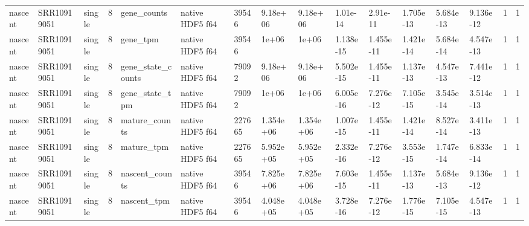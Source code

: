 \begin{tabular}{llllllllllllllll}
nascent & SRR10919051 & single & 8 & gene\_counts & native HDF5 f64 & 39546 & 9.18e+06 & 9.18e+06 & 1.01e-14 & 2.91e-11 & 1.705e-13 & 5.684e-13 & 9.136e-12 & 1 & 1 \\
nascent & SRR10919051 & single & 8 & gene\_tpm & native HDF5 f64 & 39546 & 1e+06 & 1e+06 & 1.138e-15 & 1.455e-11 & 1.421e-14 & 5.684e-14 & 4.547e-13 & 1 & 1 \\
nascent & SRR10919051 & single & 8 & gene\_state\_counts & native HDF5 f64 & 79092 & 9.18e+06 & 9.18e+06 & 5.502e-15 & 1.455e-11 & 1.137e-13 & 4.547e-13 & 7.441e-12 & 1 & 1 \\
nascent & SRR10919051 & single & 8 & gene\_state\_tpm & native HDF5 f64 & 79092 & 1e+06 & 1e+06 & 6.005e-16 & 7.276e-12 & 7.105e-15 & 3.545e-14 & 3.514e-13 & 1 & 1 \\
nascent & SRR10919051 & single & 8 & mature\_counts & native HDF5 f64 & 227665 & 1.354e+06 & 1.354e+06 & 1.007e-15 & 1.455e-11 & 1.421e-14 & 8.527e-14 & 3.411e-13 & 1 & 1 \\
nascent & SRR10919051 & single & 8 & mature\_tpm & native HDF5 f64 & 227665 & 5.952e+05 & 5.952e+05 & 2.332e-16 & 7.276e-12 & 3.553e-15 & 1.747e-14 & 6.833e-14 & 1 & 1 \\
nascent & SRR10919051 & single & 8 & nascent\_counts & native HDF5 f64 & 39546 & 7.825e+06 & 7.825e+06 & 7.603e-15 & 1.455e-11 & 1.137e-13 & 5.684e-13 & 9.136e-12 & 1 & 1 \\
nascent & SRR10919051 & single & 8 & nascent\_tpm & native HDF5 f64 & 39546 & 4.048e+05 & 4.048e+05 & 3.728e-16 & 7.276e-12 & 1.776e-15 & 7.105e-15 & 4.547e-13 & 1 & 1 \\
\bottomrule
\end{tabular}
